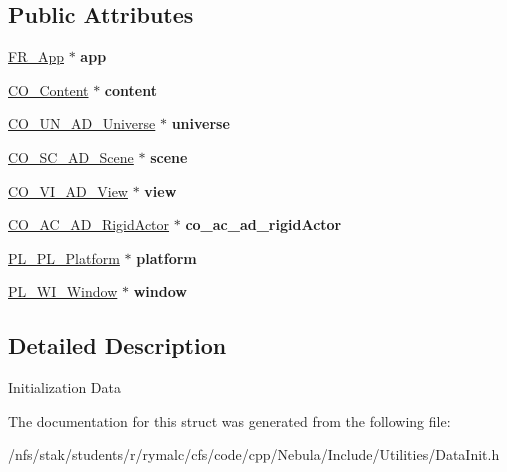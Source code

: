 \subsection*{Public Attributes}
\begin{DoxyCompactItemize}
\item 
\hypertarget{structVoid_1_1DataInit_a613d7dbb98a91af3ff25b3a7075406d4}{
\hyperlink{classFramework_1_1App}{FR\_\-App} $\ast$ {\bfseries app}}
\label{structVoid_1_1DataInit_a613d7dbb98a91af3ff25b3a7075406d4}

\item 
\hypertarget{structVoid_1_1DataInit_a5b89b4475f28180037fe47499d5cc62c}{
\hyperlink{classContent_1_1Content}{CO\_\-Content} $\ast$ {\bfseries content}}
\label{structVoid_1_1DataInit_a5b89b4475f28180037fe47499d5cc62c}

\item 
\hypertarget{structVoid_1_1DataInit_a8721995f856438caedaa0063683ef70c}{
\hyperlink{classContent_1_1Universe_1_1Admin_1_1Universe}{CO\_\-UN\_\-AD\_\-Universe} $\ast$ {\bfseries universe}}
\label{structVoid_1_1DataInit_a8721995f856438caedaa0063683ef70c}

\item 
\hypertarget{structVoid_1_1DataInit_a0776f7c99708d0589eb1049ac18a5818}{
\hyperlink{classContent_1_1Scene_1_1Admin_1_1Scene}{CO\_\-SC\_\-AD\_\-Scene} $\ast$ {\bfseries scene}}
\label{structVoid_1_1DataInit_a0776f7c99708d0589eb1049ac18a5818}

\item 
\hypertarget{structVoid_1_1DataInit_a0c4b82e444b24a5f257fc64236e98ec2}{
\hyperlink{classContent_1_1View_1_1Admin_1_1View}{CO\_\-VI\_\-AD\_\-View} $\ast$ {\bfseries view}}
\label{structVoid_1_1DataInit_a0c4b82e444b24a5f257fc64236e98ec2}

\item 
\hypertarget{structVoid_1_1DataInit_ab3b42740c8119da9954a75f35944fe6e}{
\hyperlink{classContent_1_1Actor_1_1Admin_1_1RigidActor}{CO\_\-AC\_\-AD\_\-RigidActor} $\ast$ {\bfseries co\_\-ac\_\-ad\_\-rigidActor}}
\label{structVoid_1_1DataInit_ab3b42740c8119da9954a75f35944fe6e}

\item 
\hypertarget{structVoid_1_1DataInit_a13a7a43f067959bcd7227454f047bb92}{
\hyperlink{classPlatform_1_1Platform_1_1Platform}{PL\_\-PL\_\-Platform} $\ast$ {\bfseries platform}}
\label{structVoid_1_1DataInit_a13a7a43f067959bcd7227454f047bb92}

\item 
\hypertarget{structVoid_1_1DataInit_a20f87fc3a1e743d1214a17c913371299}{
\hyperlink{classPlatform_1_1Window_1_1Window}{PL\_\-WI\_\-Window} $\ast$ {\bfseries window}}
\label{structVoid_1_1DataInit_a20f87fc3a1e743d1214a17c913371299}

\end{DoxyCompactItemize}


\subsection{Detailed Description}
Initialization Data 

The documentation for this struct was generated from the following file:\begin{DoxyCompactItemize}
\item 
/nfs/stak/students/r/rymalc/cfs/code/cpp/Nebula/Include/Utilities/DataInit.h\end{DoxyCompactItemize}
